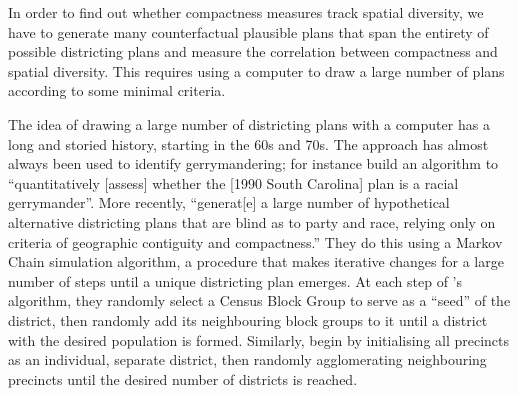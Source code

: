 \documentclass[]{article}
\begin{document}
In order to find out whether compactness measures track spatial
diversity, we have to generate many counterfactual plausible plans that
span the entirety of possible districting plans and measure the
correlation between compactness and spatial diversity. This requires
using a computer to draw a large number of plans according to some
minimal criteria.

The idea of drawing a large number of districting plans with a computer
has a long and storied history, starting in the 60s and 70s. The
approach has almost always been used to identify gerrymandering; for
instance \cite{ccd2000} build an algorithm to ``quantitatively
{[}assess{]} whether the {[}1990 South Carolina{]} plan is a racial
gerrymander''. More recently, \cite{cr2013} ``generat{[}e{]} a large
number of hypothetical alternative districting plans that are blind as
to party and race, relying only on criteria of geographic contiguity and
compactness.'' They do this using a Markov Chain simulation algorithm, a
procedure that makes iterative changes for a large number of steps until
a unique districting plan emerges. At each step of
\citeauthor{ccd2000}'s algorithm, they randomly select a Census Block
Group to serve as a ``seed'' of the district, then randomly add its
neighbouring block groups to it until a district with the desired
population is formed. Similarly, \citeauthor{cr2013} begin by
initialising all precincts as an individual, separate district, then
randomly agglomerating neighbouring precincts until the desired number
of districts is reached.
\end{document}
